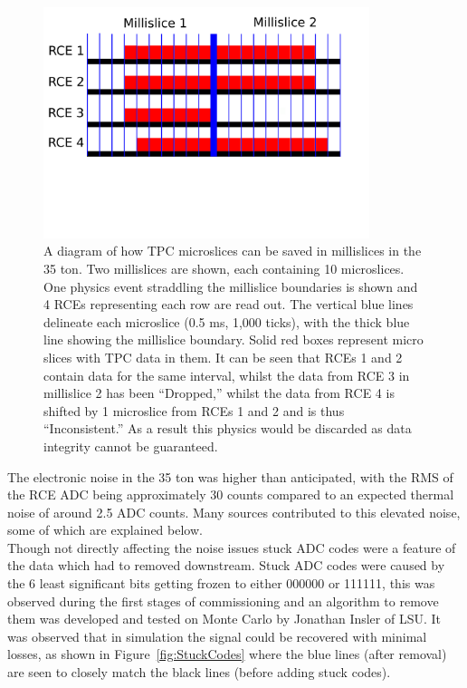 \begin{figure}[h!]
  \centering
  \includegraphics[width=0.85\textwidth]{DataDrops}
  \caption[Dropped TPC data in the 35 ton]{A diagram of how TPC microslices can be saved in millislices in the 35 ton. Two millislices are shown, each containing 10 microslices. One physics event straddling the millislice boundaries is shown and 4 RCEs representing each row are read out. The vertical blue lines delineate each microslice (0.5 ms, 1,000 ticks), with the thick blue line showing the millislice boundary. Solid red boxes represent micro slices with TPC data in them. It can be seen that RCEs 1 and 2 contain data for the same interval, whilst the data from RCE 3 in millislice 2 has been ``Dropped,'' whilst the data from RCE 4 is shifted by 1 microslice from RCEs 1 and 2 and is thus ``Inconsistent.'' As a result this physics would be discarded as data integrity cannot be guaranteed.}
  \label{fig:DataDrops}
\end{figure}

The electronic noise in the 35 ton was higher than anticipated, with the RMS of the RCE ADC being approximately 30 counts compared to an expected thermal noise of around 2.5 ADC counts. Many sources contributed to this elevated noise, some of which are explained below. \\

Though not directly affecting the noise issues stuck ADC codes were a feature of the data which had to removed downstream. Stuck ADC codes were caused by the 6 least significant bits getting frozen to either 000000 or 111111, this was observed during the first stages of commissioning and an algorithm to remove them was developed and tested on Monte Carlo by Jonathan Insler of LSU. It was observed that in simulation the signal could be recovered with minimal losses, as shown in Figure~\ref{fig:StuckCodes} where the blue lines (after removal) are seen to closely match the black lines (before adding stuck codes). \\

